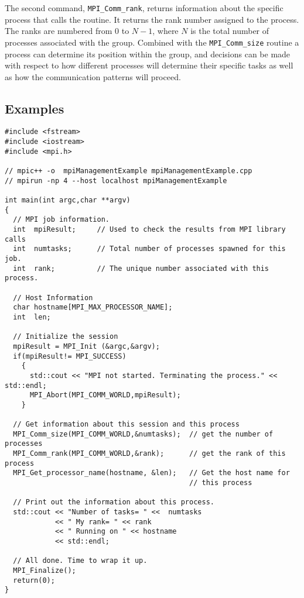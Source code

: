 The second command, \texttt{MPI\_Comm\_rank}, returns information
about the specific process that calls the routine. It returns the rank
number assigned to the process. The ranks are numbered from 0 to
$N-1$, where $N$ is the total number of processes associated with the
group. Combined with the \texttt{MPI\_Comm\_size} routine a process
can determine its position within the group, and decisions can be made
with respect to how different processes will determine their specific
tasks as well as how the communication patterns will proceed.

\subsection{Examples}


\lstset{language=C++, numbers=left, numberstyle=\tiny, stepnumber=1,
  numbersep=5pt, commentstyle=\scriptsize}
\begin{lstlisting}[caption={Basic Process Information},
                   basicstyle=\scriptsize,
                   label=listing:basicProcess]
#include <fstream>
#include <iostream>
#include <mpi.h>

// mpic++ -o  mpiManagementExample mpiManagementExample.cpp 
// mpirun -np 4 --host localhost mpiManagementExample

int main(int argc,char **argv)
{
  // MPI job information.
  int  mpiResult;     // Used to check the results from MPI library calls
  int  numtasks;      // Total number of processes spawned for this job.
  int  rank;          // The unique number associated with this process.

  // Host Information 
  char hostname[MPI_MAX_PROCESSOR_NAME];
  int  len;

  // Initialize the session
  mpiResult = MPI_Init (&argc,&argv);
  if(mpiResult!= MPI_SUCCESS)
    {
      std::cout << "MPI not started. Terminating the process." << std::endl;
      MPI_Abort(MPI_COMM_WORLD,mpiResult);
    }

  // Get information about this session and this process 
  MPI_Comm_size(MPI_COMM_WORLD,&numtasks);  // get the number of processes
  MPI_Comm_rank(MPI_COMM_WORLD,&rank);      // get the rank of this process
  MPI_Get_processor_name(hostname, &len);   // Get the host name for
                                            // this process

  // Print out the information about this process.
  std::cout << "Number of tasks= " <<  numtasks
            << " My rank= " << rank
            << " Running on " << hostname
            << std::endl;

  // All done. Time to wrap it up.
  MPI_Finalize();
  return(0);
}
\end{lstlisting}


